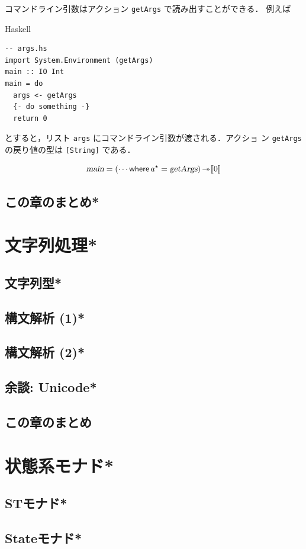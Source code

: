 \documentclass[a5paper,twoside,fleqn,draft]{jsbook}
\def\[{[\![}
\def\]{]\!]}
\newcommand{\programminglanguage}[1]{\textsf{#1}}
\newcommand{\haskell}{\programminglanguage{Haskell}}
\newcommand{\code}[1]{\texttt{#1}}
\newenvironment{haskellcode}{\begin{itembox}[r]{\haskell}}{\end{itembox}}
\newcommand{\mKeyword}[1]{\mathsf{#1}}
\newcommand{\mWhereKeyword}{\mKeyword{where}}
\DeclareMathOperator{\mWhere}{\mWhereKeyword}
\newcommand{\mAction}[1]{\textsl{#1}}
\DeclareMathOperator{\mMain}{\mAction{main}}
\DeclareMathOperator{\mBindRightIgnore}{\twoheadrightarrow}
\newcommand{\mPureWith}[1]{\[#1\]}
\newcommand{\mList}[1]{{#1}^\mathrm{\star}}
\begin{document}
コマンドライン引数はアクション \code{getArgs} で読み出すことができる．
例えば
\begin{haskellcode}
\begin{verbatim}
-- args.hs
import System.Environment (getArgs)
main :: IO Int
main = do
  args <- getArgs
  {- do something -}
  return 0
\end{verbatim}
\end{haskellcode}
とすると，リスト \code{args} にコマンドライン引数が渡される．アクショ
ン \code{getArgs} の戻り値の型は \code{[String]} である．

\begin{equation}
\mMain=(\dotsb\mWhere{}\mList{a}=\mAction{getArgs})\mBindRightIgnore\mPureWith{0}
\end{equation}

\section{この章のまとめ*}

\chapter{文字列処理*}
\section{文字列型*}
\section{構文解析 (1)*}
\section{構文解析 (2)*}
\section{余談: Unicode*}
\section{この章のまとめ}

\chapter{状態系モナド*}
\section{STモナド*}
\section{Stateモナド*}
\end{document}
